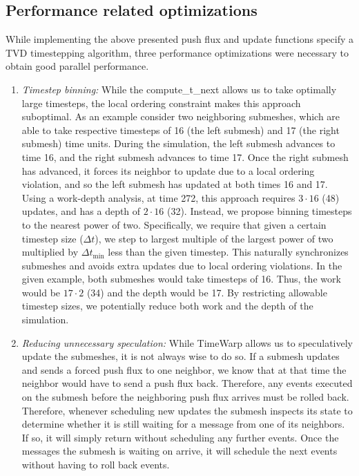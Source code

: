 \subsection{Performance related optimizations}
While implementing the above presented push flux and update functions specify a TVD timestepping algorithm, three performance optimizations were necessary to obtain good parallel performance.
\begin{enumerate}
    \item {\em Timestep binning:} While the {\sc compute\_t\_next} allows us to take optimally large timesteps, the local ordering constraint makes this approach suboptimal. As an example consider two neighboring submeshes, which are able to take respective timesteps of 16 (the left submesh) and 17 (the right submesh) time units. During the simulation, the left submesh advances to time 16, and the right submesh advances to time 17. Once the right submesh has advanced, it forces its neighbor to update due to a local ordering violation, and so the left submesh has updated at both times 16 and 17. Using a work-depth analysis, at time 272, this approach requires $3\cdot 16$ (48) updates, and has a depth of $2\cdot 16$ (32). Instead, we propose binning timesteps to the nearest power of two. Specifically, we require that given a certain timestep size ($\Delta t$), we step to largest multiple of the largest power of two multiplied by $\Delta t_{\min}$ less than the given timestep. This naturally synchronizes submeshes and avoids extra updates due to local ordering violations. In the given example, both submeshes would take timesteps of 16. Thus, the work would be $17\cdot 2$ (34) and the depth would be 17. By restricting allowable timestep sizes, we potentially reduce both work and the depth of the simulation.
    \item {\em Reducing unnecessary speculation:} While TimeWarp allows us to speculatively update the submeshes, it is not always wise to do so. If a submesh updates and sends a forced push flux to one neighbor, we know that at that time the neighbor would have to send a push flux back. Therefore, any events executed on the submesh before the neighboring push flux arrives must be rolled back. Therefore, whenever scheduling new updates the submesh inspects its state to determine whether it is still waiting for a message from one of its neighbors. If so, it will simply return without scheduling any further events. Once the messages the submesh is waiting on arrive, it will schedule the next events without having to roll back events.

\end{enumerate}
